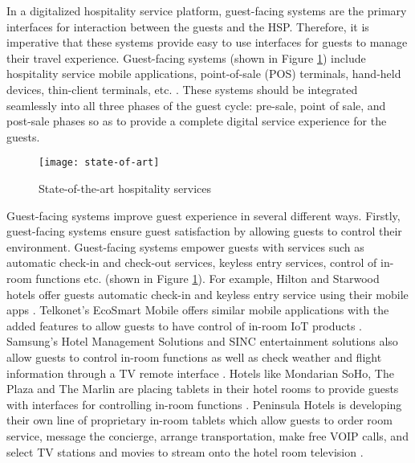 \documentclass[10pt,journal,letterpaper]{IEEEtran}
\begin{document}
{In a digitalized hospitality service platform, guest-facing systems are the primary interfaces for interaction between the guests and the HSP. Therefore, it is imperative that these systems provide easy to use interfaces for guests to manage their travel experience. Guest-facing systems (shown in Figure \ref{figure_State-of-art}) include hospitality service mobile applications, point-of-sale (POS) terminals, hand-held devices, thin-client terminals, etc. \cite{Wang_Tech_2017} \cite{Ukpabi_Tech_2017}. These systems should be integrated seamlessly into all three phases of the guest cycle: pre-sale, point of sale, and post-sale phases so as to provide a complete digital service experience for the guests.

\begin{figure}[!t]
\centering
\texttt{[image: state-of-art]}
\caption{State-of-the-art hospitality services}
\label{figure_State-of-art}
\end{figure}

Guest-facing systems improve guest experience in several different ways. Firstly, guest-facing systems ensure guest satisfaction by allowing guests to control their environment. Guest-facing systems empower guests with services such as automatic check-in and check-out services, keyless entry services, control of in-room functions etc. \cite{Wang_Tech_2017} (shown in Figure \ref{figure_State-of-art}). For example, Hilton and Starwood hotels offer guests automatic check-in and keyless entry service using their mobile apps \cite{DePinto_7TrendsIoTHospitality_2016}. Telkonet's EcoSmart Mobile offers similar mobile applications with the added features to allow guests to have control of in-room IoT products \cite{DePinto_7TrendsIoTHospitality_2016}. Samsung's Hotel Management Solutions and SINC entertainment solutions also allow guests to control in-room functions as well as check weather and flight information through a TV remote interface \cite{DePinto_7TrendsIoTHospitality_2016}. Hotels like Mondarian SoHo, The Plaza and The Marlin are placing tablets in their hotel rooms to provide guests with interfaces for controlling in-room functions \cite{VenturePact_HowIoTImprovesHospitality_2015}. Peninsula Hotels is developing their own line of proprietary in-room tablets which allow guests to order room service, message the concierge, arrange transportation, make free VOIP calls, and select TV stations and movies to stream onto the hotel room television \cite{Shallcross_MarriotEnseo_2016}.

}
\end{document}
